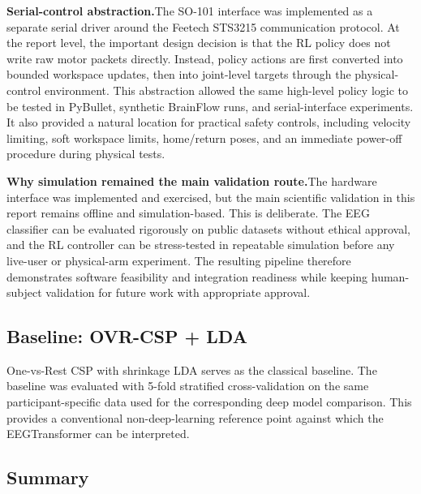 \documentclass[12pt, a4paper]{article}
\begin{document}
\textbf{Serial-control abstraction.}\quad The SO-101 interface was implemented as a separate serial driver around the Feetech STS3215 communication protocol. At the report level, the important design decision is that the RL policy does not write raw motor packets directly. Instead, policy actions are first converted into bounded workspace updates, then into joint-level targets through the physical-control environment. This abstraction allowed the same high-level policy logic to be tested in PyBullet, synthetic BrainFlow runs, and serial-interface experiments. It also provided a natural location for practical safety controls, including velocity limiting, soft workspace limits, home/return poses, and an immediate power-off procedure during physical tests.

\textbf{Why simulation remained the main validation route.}\quad The hardware interface was implemented and exercised, but the main scientific validation in this report remains offline and simulation-based. This is deliberate. The EEG classifier can be evaluated rigorously on public datasets without ethical approval, and the RL controller can be stress-tested in repeatable simulation before any live-user or physical-arm experiment. The resulting pipeline therefore demonstrates software feasibility and integration readiness while keeping human-subject validation for future work with appropriate approval.

\subsection{Baseline: OVR-CSP + LDA}

One-vs-Rest CSP with shrinkage LDA serves as the classical baseline. The baseline was evaluated with 5-fold stratified cross-validation on the same participant-specific data used for the corresponding deep model comparison. This provides a conventional non-deep-learning reference point against which the EEGTransformer can be interpreted.

\subsection{Summary}
\end{document}
